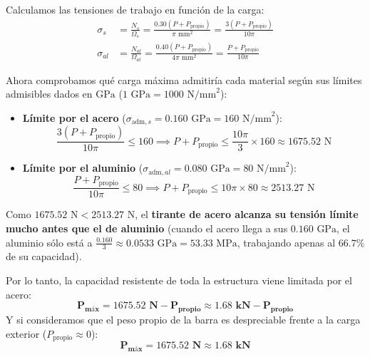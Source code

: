 
Calculamos las tensiones de trabajo en función de la carga:
\begin{align}
    \sigma_s  & = \frac{N_s}{\Omega_s} = \frac{0.30\left(P + P_{\text{propio}}\right)}{\pi\text{ mm}^2} = \frac{3\left(P + P_{\text{propio}}\right)}{10\pi} \\
    \sigma_{al} & = \frac{N_{al}}{\Omega_{al}} = \frac{0.40\left(P + P_{\text{propio}}\right)}{4\pi\text{ mm}^2} = \frac{P + P_{\text{propio}}}{10\pi}
\end{align}

Ahora comprobamos qué carga máxima admitiría cada material según sus límites admisibles dados en $\text{GPa}$ ($1\text{ GPa} = 1000\text{ N/mm}^2$):
\begin{itemize}
    \item \textbf{Límite por el acero} ($\sigma_{\text{adm}, s} = 0.160\text{ GPa} = 160\text{ N/mm}^2$):
          \begin{equation}
              \frac{3\left(P + P_{\text{propio}}\right)}{10\pi} \le 160 \implies P + P_{\text{propio}} \le \frac{10\pi}{3} \times 160 \approx 1675.52\text{ N}
          \end{equation}
    \item \textbf{Límite por el aluminio} ($\sigma_{\text{adm}, al} = 0.080\text{ GPa} = 80\text{ N/mm}^2$):
          \begin{equation}
              \frac{P + P_{\text{propio}}}{10\pi} \le 80 \implies P + P_{\text{propio}} \le 10\pi \times 80 \approx 2513.27\text{ N}
          \end{equation}
\end{itemize}

Como $1675.52\text{ N} < 2513.27\text{ N}$, el \textbf{tirante de acero alcanza su tensión límite mucho antes que el de aluminio} (cuando el acero llega a sus $0.160\text{ GPa}$, el aluminio sólo está a $\frac{0.160}{3} \approx 0.0533\text{ GPa} = 53.33\text{ MPa}$, trabajando apenas al $66.7\%$ de su capacidad).

Por lo tanto, la capacidad resistente de toda la estructura viene limitada por el acero:
\begin{equation}
    \mathbf{P_{\text{máx}} = 1675.52\text{ N} - P_{\text{propio}} \approx 1.68\text{ kN} - P_{\text{propio}}}
\end{equation}
Y si consideramos que el peso propio de la barra es despreciable frente a la carga exterior ($P_{\text{propio}} \approx 0$):
\begin{equation}
    \mathbf{P_{\text{máx}} = 1675.52\text{ N} \approx 1.68\text{ kN}}
\end{equation}


